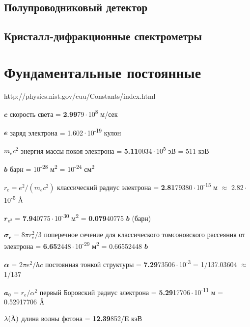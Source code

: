 \documentclass[a4paper,14pt, openany, twoside, draft]{extbook} %
\newcommand{\AAA}{\textup{\AA}}
\begin{document}
\section{Полупроводниковый детектор}
\section{Кристалл-дифракционные спектрометры}

\newpage
\chapter*{Фундаментальные постоянные}
{http://physics.nist.gov/cuu/Constants/index.html}


$\mathbfit{c}$  скорость света =  \textbf{2.99}79\,$\cdot$\,10\textsuperscript{8} м/сек %

$\mathbfit{e}$  заряд электрона = 1.602\,$\cdot$\,10\textsuperscript{-19} кулон

$m_ec^2$  энергия массы покоя электрона = \textbf{5.11}0034\,$\cdot$\,10\textsuperscript{5} эВ = 511 кэВ

$\mathbfit{b}$  барн = 10\textsuperscript{-28} м\textsuperscript{2} = 10\textsuperscript{-24} см\textsuperscript{2}

$r_e=e^2/(m_ec^2)$  классический радиус электрона = \textbf{2.81}79380\,$\cdot$\,10\textsuperscript{-15} м $\approx$ 2.82\,$\cdot$\,10\textsuperscript{-5} $\AAA$

$\mathbfit{r_{e^2}}$ = \textbf{7.94}0775\,$\cdot$\,10\textsuperscript{-30} м\textsuperscript{2}  = \textbf{0.079}40775 $\mathbfit{b}$ (барн)

$\mathbfit{\sigma_r}$ = $8\pi r_e^2/3$ поперечное сечение для классического томсоновского рассеяния от электрона = \textbf{6.65}2448\,$\cdot$\,10\textsuperscript{-29} м\textsuperscript{2} = 0.66552448 $\mathbfit{b}$

$\mathbfit{\alpha}$ = $2\pi e^2/hc$ постоянная тонкой структуры = \textbf{7.29}73506\,$\cdot$\,10\textsuperscript{-3} = 1/137.03604 $\approx$ 1/137

$\mathbfit{a_0}$ = $r_e/\alpha^2$ первый Боровский радиус электрона  = \textbf{5.29}17706\,$\cdot$\,10\textsuperscript{-11} м = 0.52917706 $\AAA$

$\lambda(\AAA)$  длина волны фотона = \textbf{12.39}852/E кэВ
\end{document}

